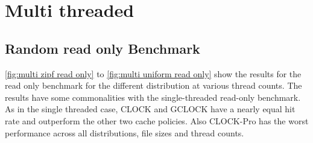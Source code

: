 \documentclass[
	12pt,
	a4paper,
	abstract,
	bibliography=totoc,
	chapterprefix,
	headings=openright,
	numbers=endperiod,
	parskip=half,
	twoside,
]{scrreprt}
\begin{document}



\section{Multi threaded}
\subsection{Random read only Benchmark}

\cref{fig:multi zipf read only} to \cref{fig:multi uniform read only}
show the results for the read only benchmark for the different distribution at various thread counts.
The results have some commonalities with the single-threaded read-only benchmark.
As in the single threaded case, CLOCK and GCLOCK have a nearly equal hit rate and outperform the other two cache policies.
Also CLOCK-Pro has the worst performance across all distributions, file sizes and thread counts.
\end{document}
